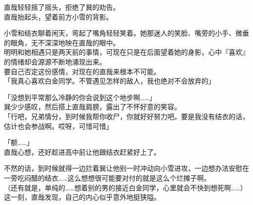 直哉轻轻摇了摇头，拒绝了巽的劝告。\\

直哉抬起头，望着前方小雪的背影。

小雪和结衣聊着闲天，弯起了嘴角轻轻笑着。她那迷人的笑脸、嘴旁的小手、微垂的眼角，无不深深地映在直哉的眼中。\\

明明和她相遇只是两天前的事情，可现在只是在后面望着她的身影，心中『喜欢』的情绪却会源源不断地涌现出来。\\

要自己否定这份感情，对现在的直哉来根本不可能。\\

「我真心喜欢白金同学。不管遇见怎样的敌人，我也绝对不会放弃的」

「没想到平常那么冷静的你会说到这个地步啊……」\\

巽少少感叹，然后搭上直哉肩膀，露出了不怀好意的笑容。\\

「行吧，兄弟情分，到时候我帮你收尸，你就好好努力吧。要是我没有结衣的话，估计也会参战啊。哎呀，可惜可惜」

「额……」\\

直哉心想，还好趁进高中前让他跟结衣赶紧好上了。

不然的话，到时候就得一边拦着巽让他别一时冲动向小雪进攻，一边想办法安慰在一旁吃闷醋的结衣……这么想想很可能要对付的就是这么个烂摊子啊。\\

（还有就是，单纯的……想着别的男的接近白金同学，心里就会不快到想死啊……）\\

这一刻，直哉发现，自己的内心似乎意外地挺狭隘。
